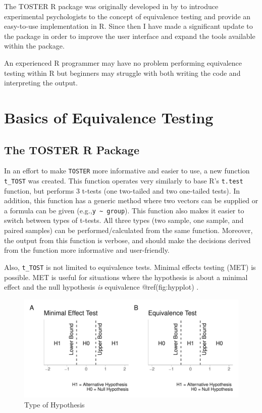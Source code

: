 \documentclass[]{interact}
\theoremstyle{plain}%
\theoremstyle{definition}
\theoremstyle{remark}
\begin{document}
The TOSTER R package was originally developed in by \citet{lakens_ori}
to introduce experimental psychologists to the concept of equivalence
testing and provide an easy-to-use implementation in R. Since then I
have made a significant update to the package in order to improve the
user interface and expand the tools available within the package.

An experienced R programmer may have no problem performing equivalence
testing within R but beginners may struggle with both writing the code
and interpreting the output.

\hypertarget{basics-of-equivalence-testing}{%
\section{Basics of Equivalence
Testing}\label{basics-of-equivalence-testing}}

\hypertarget{the-toster-r-package}{%
\subsection{The TOSTER R Package}\label{the-toster-r-package}}

In an effort to make \texttt{TOSTER} more informative and easier to use,
a new function \texttt{t\_TOST} was created. This function operates very
similarly to base R's \texttt{t.test} function, but performs 3 t-tests
(one two-tailed and two one-tailed tests). In addition, this function
has a generic method where two vectors can be supplied or a formula can
be given (e.g.,\texttt{y\ \textasciitilde{}\ group}). This function also
makes it easier to switch between types of t-tests. All three types (two
sample, one sample, and paired samples) can be performed/calculated from
the same function. Moreover, the output from this function is verbose,
and should make the decisions derived from the function more informative
and user-friendly.

Also, \texttt{t\_TOST} is not limited to equivalence tests. Minimal
effects testing (MET) is possible. MET is useful for situations where
the hypothesis is about a minimal effect and the null hypothesis
\emph{is} equivalence @ref(fig:hypplot) .

\begin{figure}
\centering
\includegraphics{Avocado_Update_files/figure-latex/hypplot-1.pdf}
\caption{Type of Hypothesis}
\end{figure}
\end{document}
